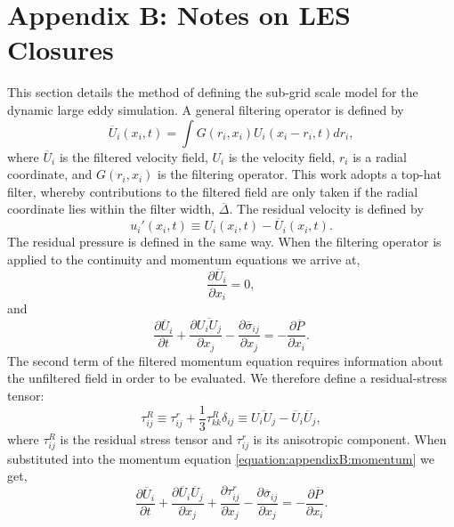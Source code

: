 \documentclass[12pt,oneside,a4paper]{article}
\newcommand{\pdev}[2]{\frac{\partial {#1}}{\partial {#2}}}
\begin{document}
\section*{Appendix B: Notes on LES Closures}
This section details the method of defining the sub-grid scale model for the dynamic large eddy simulation. A general filtering operator is defined by
\begin{equation}
\overline{U}_i(x_i,t) = \int G(r_i,x_i) U_i(x_i - r_i,t) dr_i,
\end{equation} 
where $\overline{U}_i$ is the filtered velocity field, $U_i$ is the velocity field, $r_i$ is a radial coordinate, and $G(r_i,x_i)$ is the filtering operator. This work adopts a top-hat filter, whereby contributions to the filtered field are only taken if the radial coordinate lies within the filter width, $\overline{\Delta}$. The residual velocity is defined by
\begin{equation}
u_i'(x_i,t) \equiv U_i(x_i,t) - \overline{U}_i(x_i,t).
\end{equation}
The residual pressure is defined in the same way. When the filtering operator is applied to the continuity and momentum equations we arrive at,
\begin{equation}
\label{equation:appendixB:cont}
\pdev{\overline{U}_i}{x_i} = 0,
\end{equation}
and
\begin{equation}
\label{equation:appendixB:momentum}
\pdev{\overline{U}_i}{t} + \pdev{\overline{U_i U_j}}{x_j} - \pdev{\overline{\sigma}_{ij}}{x_j} = - \pdev{\overline{P}}{x_i}.
\end{equation}
The second term of the filtered momentum equation requires information about the unfiltered field in order to be evaluated. We therefore define a residual-stress tensor:
\begin{equation}
\tau_{ij}^R \equiv  \tau_{ij}^r + \frac{1}{3} \tau_{kk}^R \delta_{ij}  \equiv \overline{U_i U_j} - \overline{U}_i \overline{U}_j,
\end{equation}
where $\tau_{ij}^R$ is the residual stress tensor and $\tau_{ij}^r$ is its anisotropic component. When substituted into the momentum equation \eqref{equation:appendixB:momentum} we get,
\begin{equation}
\label{equation:appendixB:momentumFil}
\pdev{\overline{U}_i}{t} + \pdev{\overline{U}_i \overline{U}_j}{x_j} + \pdev{\tau_{ij}^r}{x_j} - \pdev{\overline{\sigma}_{ij}}{x_j} = - \pdev{\overline{P}}{x_i}.
\end{equation}
\end{document}
